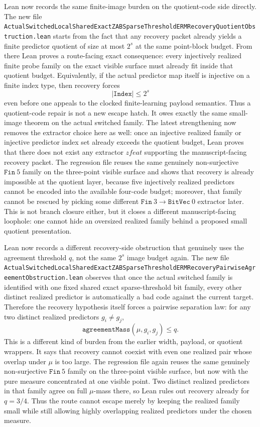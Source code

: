 \documentclass[11pt]{article}
\theoremstyle{remark}
\begin{document}
Lean now records the same finite-image burden on the quotient-code side
directly.  The new file
\texttt{ActualSwitchedLocalSharedExactZABSparseThresholdERMRecoveryQuotientObstruction.lean}
starts from the fact that any recovery packet already yields a finite
predictor quotient of size at most \(2^s\) at the same point-block budget.
From there Lean proves a route-facing exact consequence: every injectively
realized finite probe family on the exact visible surface must already fit
inside that quotient budget.  Equivalently, if the actual predictor map itself
is injective on a finite index type, then recovery forces
\[
  |\texttt{Index}| \le 2^s
\]
even before one appeals to the clocked finite-learning payload semantics.
Thus a quotient-code repair is not a new escape hatch.  It owes exactly the
same small-image theorem on the actual switched family.  The latest
strengthening now removes the extractor choice here as well: once an injective
realized family or injective predictor index set already exceeds the quotient
budget, Lean proves that there does not exist any extractor \(zfeat\)
supporting the manuscript-facing recovery packet.  The regression file reuses
the same genuinely non-surjective \(\texttt{Fin}\ 5\) family on the three-point
visible surface and shows that recovery is already impossible at the quotient
layer, because five injectively realized predictors cannot be encoded into the
available four-code budget; moreover, that family cannot be rescued by picking
some different \(\texttt{Fin}\ 3 \to \texttt{BitVec}\ 0\) extractor later.
This is not branch closure either, but it closes a different manuscript-facing
loophole: one cannot hide an oversized realized family behind a proposed small
quotient presentation.

Lean now records a different recovery-side obstruction that genuinely uses the
agreement threshold \(q\), not the same \(2^s\) image budget again.  The new
file
\texttt{ActualSwitchedLocalSharedExactZABSparseThresholdERMRecoveryPairwiseAgreementObstruction.lean}
observes that once the actual switched family is identified with one fixed
shared exact sparse-threshold bit family, every other distinct realized
predictor is automatically a bad code against the current target.  Therefore
the recovery hypothesis itself forces a pairwise separation law:
for any two distinct realized predictors \(g_i \neq g_j\),
\[
  \texttt{agreementMass}(\mu,g_i,g_j) \le q.
\]
This is a different kind of burden from the earlier width, payload, or quotient
wrappers.  It says that recovery cannot coexist with even one realized pair
whose overlap under \(\mu\) is too large.  The regression file again reuses the
same genuinely non-surjective \(\texttt{Fin}\ 5\) family on the three-point
visible surface, but now with the pure measure concentrated at one visible
point.  Two distinct realized predictors in that family agree on full
\(\mu\)-mass there, so Lean rules out recovery already for \(q = 3/4\).  Thus
the route cannot escape merely by keeping the realized family small while still
allowing highly overlapping realized predictors under the chosen measure.
\end{document}
